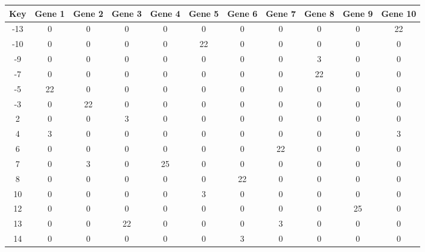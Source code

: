 \begin{tabular}{|c|c|c|c|c|c|c|c|c|c|c|}
\hline
Key & Gene 1 & Gene 2 & Gene 3 & Gene 4 & Gene 5 & Gene 6 & Gene 7 & Gene 8 & Gene 9 & Gene 10 \\
\hline
-13 & 0 & 0 & 0 & 0 & 0 & 0 & 0 & 0 & 0 & 22 \\
-10 & 0 & 0 & 0 & 0 & 22 & 0 & 0 & 0 & 0 & 0 \\
-9 & 0 & 0 & 0 & 0 & 0 & 0 & 0 & 3 & 0 & 0 \\
-7 & 0 & 0 & 0 & 0 & 0 & 0 & 0 & 22 & 0 & 0 \\
-5 & 22 & 0 & 0 & 0 & 0 & 0 & 0 & 0 & 0 & 0 \\
-3 & 0 & 22 & 0 & 0 & 0 & 0 & 0 & 0 & 0 & 0 \\
2 & 0 & 0 & 3 & 0 & 0 & 0 & 0 & 0 & 0 & 0 \\
4 & 3 & 0 & 0 & 0 & 0 & 0 & 0 & 0 & 0 & 3 \\
6 & 0 & 0 & 0 & 0 & 0 & 0 & 22 & 0 & 0 & 0 \\
7 & 0 & 3 & 0 & 25 & 0 & 0 & 0 & 0 & 0 & 0 \\
8 & 0 & 0 & 0 & 0 & 0 & 22 & 0 & 0 & 0 & 0 \\
10 & 0 & 0 & 0 & 0 & 3 & 0 & 0 & 0 & 0 & 0 \\
12 & 0 & 0 & 0 & 0 & 0 & 0 & 0 & 0 & 25 & 0 \\
13 & 0 & 0 & 22 & 0 & 0 & 0 & 3 & 0 & 0 & 0 \\
14 & 0 & 0 & 0 & 0 & 0 & 3 & 0 & 0 & 0 & 0 \\
\hline
\end{tabular}